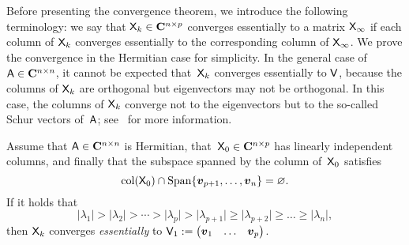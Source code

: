 Before presenting the convergence theorem,
we introduce the following terminology: we say that $\mathsf X_k \in \mathbf C^{n \times p}$ converges essentially to a matrix $\mathsf X_{\infty}$
if each column of $\mathsf X_k$ converges essentially to the corresponding column of $\mathsf X_{\infty}$.
We prove the convergence in the Hermitian case for simplicity.
In the general case of~$\mathsf A \in \mathbf C^{n \times n}$,
it cannot be expected that~$\mathsf X_k$ converges essentially to $\mathsf V$,
because the columns of $\mathsf X_k$ are orthogonal but eigenvectors may not be orthogonal.
In this case, the columns of $\mathsf X_k$ converge not to the eigenvectors
but to the so-called Schur vectors of~$\mathsf A$;
see~\cite{MR3396212} for more information.
\begin{theorem}
    \label{theorem:convergence_subspace_iteration}
    Assume that $\mathsf A \in \mathbf C^{n \times n}$ is Hermitian,
    that~$\mathsf X_0 \in \mathbf C^{n \times p}$ has linearly independent columns,
    and finally that the subspace spanned by the column of~$\mathsf X_0$ satisfies
    \begin{equation}
        \label{eq:assumption_subspace_iteration}
        \operatorname{col}(\mathsf X_0) \cap \operatorname{Span} \{ \mathbf{\boldsymbol{v}}_{p+1}, \dotsc, \mathbf{\boldsymbol{v}}_n \} = \varnothing.
    \end{equation}
    If it holds that
    \begin{equation}
        \label{eq:order_eigenvalues}
        \lvert \lambda_1 \rvert > \lvert \lambda_2 \rvert > \dotsb > \lvert \lambda_p \rvert > \lvert \lambda_{p+1} \rvert \geq \lvert \lambda_{p+2} \rvert \geq \dotsc \geq \lvert \lambda_n \rvert,
    \end{equation}
    then $\mathsf X_k$ converges \emph{essentially} to $\mathsf V_1 := \begin{pmatrix} \mathbf{\boldsymbol{v}}_1 & \hdots & \mathbf{\boldsymbol{v}}_p \end{pmatrix}$.
\end{theorem}
